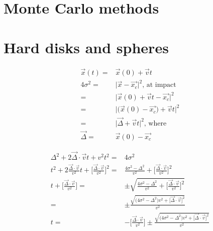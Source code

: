 \documentclass[]{article}
\title{}
\author{}
\begin{document}
\maketitle

\begin{abstract}

\end{abstract}

\section{Monte Carlo methods}

\section{Hard disks and spheres}

\begin{align*}
	\vec{x}(t) =& \vec{x}(0)+\vec{v}t\\
	4\sigma^2 =& \vert \vec{x} - \vec{x_c} \vert^2 \text{, at impact}\\
	=& \vert \vec{x}(0)+\vec{v}t  - \vec{x_c}\vert^2\\
	=& \vert \big(\vec{x}(0)- \vec{x_c}\big)+\vec{v}t  \vert^2\\
	=& \vert \vec{\Delta}+\vec{v}t   \vert^2 \text{, where }\\
	\vec{\Delta} =&\vec{x}(0)- \vec{x_c}
\end{align*}

\begin{align*}
	\Delta^2 + 2 \vec{\Delta}\cdot\vec{v}t + v^2t^2 =& 4\sigma^2\\
	t^2 + 2\frac{\vec{\Delta}\cdot\vec{v}}{v^2}t + \big[\frac{\vec{\Delta}\cdot\vec{v}}{v^2}\big]^2=& \frac{ 4\sigma^2 - \Delta^2}{v^2}  + \big[\frac{\vec{\Delta}\cdot\vec{v}}{v^2}\big]^2\\
	t + \big[\frac{\vec{\Delta}\cdot\vec{v}}{v^2}\big]=& \pm \sqrt{\frac{ 4\sigma^2 - \Delta^2}{v^2}  + \big[\frac{\vec{\Delta}\cdot\vec{v}}{v^2}\big]^2}\\
	=& \pm \frac{\sqrt{\big(4\sigma^2 - \Delta^2\big)v^2  + \big[\vec{\Delta}\cdot\vec{v}\big]^2}}{v^2}\\
	t =& - \big[\frac{\vec{\Delta}\cdot\vec{v}}{v^2}\big] \pm \frac{\sqrt{\big(4\sigma^2 - \Delta^2\big)v^2  + \big[\vec{\Delta}\cdot\vec{v}\big]^2}}{v^2}
\end{align*}
\end{document}
